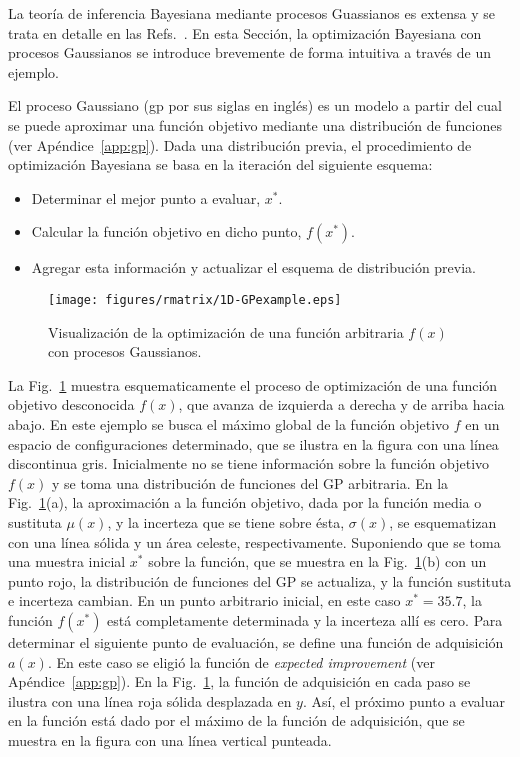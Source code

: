 La teoría de inferencia Bayesiana mediante procesos Guassianos es 
extensa y se trata en detalle en las Refs.~\cite{Rasmussen:06,Murphy:12}. 
En esta Sección, la optimización Bayesiana con procesos Gaussianos se 
introduce brevemente de forma intuitiva a través de un ejemplo. 

El proceso Gaussiano (\acs{gp} por sus siglas en inglés) es un modelo a 
partir del cual se puede aproximar una función objetivo mediante una
distribución de funciones (ver Apéndice~\ref{app:gp}). Dada una 
distribución previa, el procedimiento de optimización Bayesiana se basa
en la iteración del siguiente esquema:
\begin{itemize}
\item Determinar el mejor punto a evaluar, $x^*$.
\item Calcular la función objetivo en dicho punto, $f(x^*)$.
\item Agregar esta información y actualizar el esquema de distribución
previa.
\end{itemize}

\begin{figure}
\centering
\texttt{[image: figures/rmatrix/1D-GPexample.eps]} 
\caption{Visualización de la optimización de una función arbitraria 
$f(x)$ con procesos Gaussianos.}
\label{fig:visualizacion-gp}
\end{figure}

La Fig.~\ref{fig:visualizacion-gp} muestra esquematicamente el proceso 
de optimización de una función objetivo desconocida $f(x)$, que avanza
de izquierda a derecha y de arriba hacia abajo. En este ejemplo se busca 
el máximo global de la función objetivo $f$ en un espacio de 
configuraciones determinado, que se ilustra en la figura con una línea 
discontinua gris. 
Inicialmente no se tiene información sobre la función objetivo $f(x)$ y 
se toma una distribución de funciones del GP arbitraria. En la 
Fig.~\ref{fig:visualizacion-gp}(a), la aproximación a la función 
objetivo, dada por la función media o sustituta $\mu(x)$, y la incerteza 
que se tiene sobre ésta, $\sigma(x)$, se esquematizan con una línea 
sólida y un área celeste, respectivamente. 
Suponiendo que se toma una muestra inicial $x^*$ sobre la función, que 
se muestra en la Fig.~\ref{fig:visualizacion-gp}(b) con un punto rojo,
la distribución de funciones del GP se actualiza, y la función sustituta 
e incerteza cambian. En un punto arbitrario inicial, en este caso 
$x^*=35.7$, la función $f(x^*)$ está completamente determinada y la 
incerteza allí es cero. Para determinar el siguiente punto de evaluación, 
se define una función de adquisición $a(x)$. En este caso se eligió la 
función de \textit{expected improvement} (ver Apéndice~\ref{app:gp}).
En la Fig.~\ref{fig:visualizacion-gp}, la función de adquisición en cada 
paso se ilustra con una línea roja sólida desplazada en $y$. Así, el 
próximo punto a evaluar en la función está dado por el máximo de la 
función de adquisición, que se muestra en la figura con una línea 
vertical punteada.

